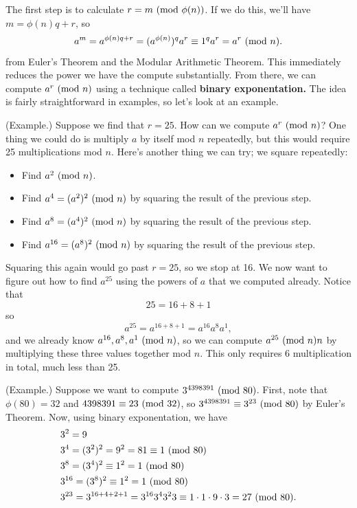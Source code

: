 \documentclass[letterpaper]{article}
\begin{document}
The first step is to calculate $r = m \ (\mathrm{mod}\ \phi(n))$. If we do this, we'll have $m = \phi(n)q + r$, so \begin{equation}
    a^m = a^{\phi(n) q + r} = (a^{\phi(n)})^q a^r \equiv 1^q a^r = a^r \ (\mathrm{mod}\ n).
\end{equation}
from Euler's Theorem and the Modular Arithmetic Theorem. This immediately reduces the power we have the compute substantially. From there, we can compute $a^r \ (\mathrm{mod}\ n)$ using a technique called \textbf{binary exponentation.} The idea is fairly straightforward in examples, so let's look at an example. 

\begin{mdframed}
    (Example.) Suppose we find that $r = 25$. How can we compute $a^r \ (\mathrm{mod}\ n)$? One thing we could do is multiply $a$ by itself mod $n$ repeatedly, but this would require 25 multiplications mod $n$. Here's another thing we can try; we square repeatedly: 
    \begin{itemize}
        \item Find $a^2 \ (\mathrm{mod}\ n)$. 
        \item Find $a^4 = (a^2)^2 \ (\mathrm{mod}\ n)$ by squaring the result of the previous step.
        \item Find $a^8 = (a^4)^2 \ (\mathrm{mod}\ n)$ by squaring the result of the previous step.
        \item Find $a^{16} = (a^8)^2 \ (\mathrm{mod}\ n)$ by squaring the result of the previous step.
    \end{itemize}
    Squaring this again would go past $r = 25$, so we stop at 16. We now want to figure out how to find $a^{25}$ using the powers of $a$ that we computed already. Notice that \[25 = 16 + 8 + 1\] so \[a^{25} = a^{16 + 8 + 1} = a^{16}a^{8}a^{1},\] and we already know $a^{16}, a^8, a^1 \ (\mathrm{mod}\ n)$, so we can compute $a^{25} \ (\mathrm{mod}\ n) n$ by multiplying these three values together mod $n$. This only requires 6 multiplication in total, much less than 25.
\end{mdframed}

\begin{mdframed}
    (Example.) Suppose we want to compute $3^{4398391} \ (\mathrm{mod}\ 80)$. First, note that $\phi(80) = 32$ and $4398391 \equiv 23 \ (\mathrm{mod}\ 32)$, so $3^{4398391} \equiv 3^{23} \ (\mathrm{mod}\ 80)$ by Euler's Theorem. Now, using binary exponentation, we have 
    \begin{equation*}
        \begin{aligned}
            &3^2 = 9 \\ 
            &3^4 = (3^2)^2 = 9^2 = 81 \equiv 1 \ (\mathrm{mod}\ 80) \\ 
            &3^8 = (3^4)^2 \equiv 1^2 = 1 \ (\mathrm{mod}\ 80) \\ 
            &3^{16} = (3^8)^2 \equiv 1^2 = 1 \ (\mathrm{mod}\ 80) \\ 
            &3^{23} = 3^{16 + 4 + 2 + 1} = 3^{16}3^4 3^2 3 \equiv 1 \cdot 1 \cdot 9 \cdot 3 = 27 \ (\mathrm{mod}\ 80).
        \end{aligned}
    \end{equation*}
\end{mdframed}
\end{document}
